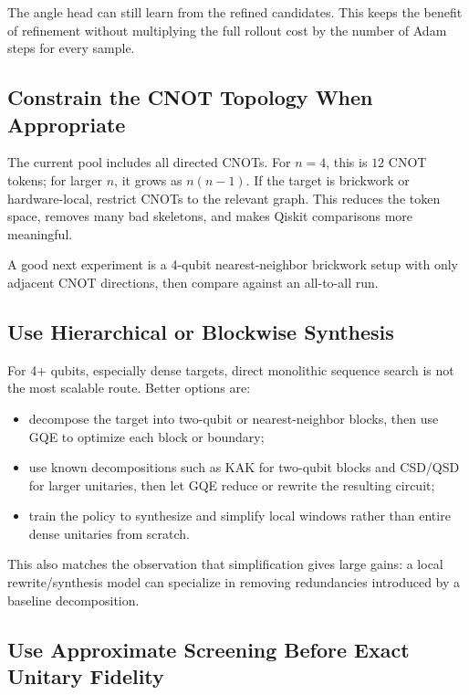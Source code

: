 \documentclass[11pt]{article}
\begin{document}
The angle head can still learn from the refined candidates.  This keeps the
benefit of refinement without multiplying the full rollout cost by the number of
Adam steps for every sample.

\subsection{Constrain the CNOT Topology When Appropriate}

The current pool includes all directed CNOTs.  For \(n=4\), this is \(12\) CNOT
tokens; for larger \(n\), it grows as \(n(n-1)\).  If the target is brickwork or
hardware-local, restrict CNOTs to the relevant graph.  This reduces the token
space, removes many bad skeletons, and makes Qiskit comparisons more meaningful.

A good next experiment is a 4-qubit nearest-neighbor brickwork setup with only
adjacent CNOT directions, then compare against an all-to-all run.

\subsection{Use Hierarchical or Blockwise Synthesis}

For 4+ qubits, especially dense targets, direct monolithic sequence search is
not the most scalable route.  Better options are:

\begin{itemize}[leftmargin=*]
  \item decompose the target into two-qubit or nearest-neighbor blocks, then use
  GQE to optimize each block or boundary;
  \item use known decompositions such as KAK for two-qubit blocks and CSD/QSD for
  larger unitaries, then let GQE reduce or rewrite the resulting circuit;
  \item train the policy to synthesize and simplify local windows rather than
  entire dense unitaries from scratch.
\end{itemize}

This also matches the observation that simplification gives large gains: a local
rewrite/synthesis model can specialize in removing redundancies introduced by a
baseline decomposition.

\subsection{Use Approximate Screening Before Exact Unitary Fidelity}
\end{document}

